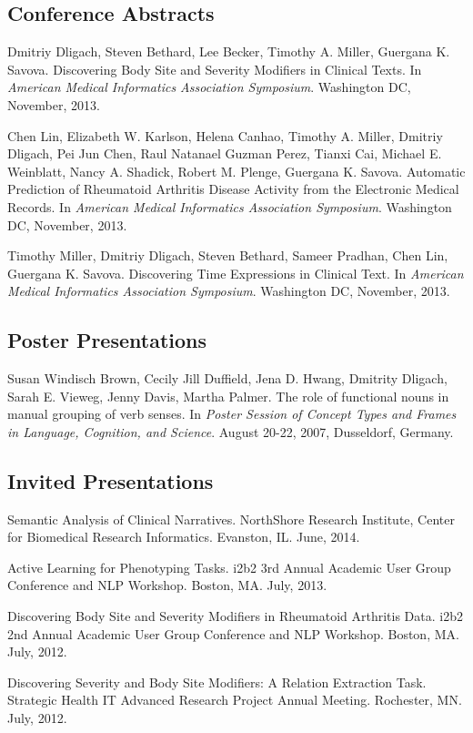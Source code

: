 \documentclass[letterpaper]{article}
\renewenvironment{itemize}{
  \begin{list}{}{
    \setlength{\leftmargin}{1.5em}
  }
}{
  \end{list}
}
\begin{document}
\subsection*{Conference Abstracts}
\begin{itemize}
\item Dmitriy Dligach, Steven Bethard, Lee Becker, Timothy A. Miller, Guergana K. Savova. Discovering Body Site and Severity Modifiers in Clinical Texts. In \emph{American Medical Informatics Association Symposium}. Washington DC, November, 2013.
\item Chen Lin, Elizabeth W. Karlson, Helena Canhao, Timothy A. Miller, Dmitriy Dligach, Pei Jun Chen, Raul Natanael Guzman Perez, Tianxi Cai, Michael E. Weinblatt, Nancy A. Shadick, Robert M. Plenge, Guergana K. Savova. Automatic Prediction of Rheumatoid Arthritis Disease Activity from the Electronic Medical Records. In \emph{American Medical Informatics Association Symposium}. Washington DC, November, 2013.
\item Timothy Miller, Dmitriy Dligach, Steven Bethard, Sameer Pradhan, Chen Lin, Guergana K. Savova. Discovering Time Expressions in Clinical Text. In \emph{American Medical Informatics Association Symposium}. Washington DC, November, 2013.
\end{itemize}

\subsection*{Poster Presentations}

\begin{itemize}
\item Susan Windisch Brown, Cecily Jill Duffield, Jena D. Hwang, Dmitrity Dligach, Sarah E. Vieweg, Jenny Davis, Martha Palmer. The role of functional nouns in manual grouping of verb senses. In \emph {Poster Session of Concept Types and Frames in Language, Cognition, and Science}. August 20-22, 2007, Dusseldorf, Germany.
\end{itemize}

\subsection*{Invited Presentations}

\begin{itemize}
\item Semantic Analysis of Clinical Narratives. NorthShore Research Institute, Center for Biomedical Research Informatics. Evanston, IL. June, 2014.
\item Active Learning for Phenotyping Tasks. i2b2 3rd Annual Academic User Group Conference and NLP Workshop. Boston, MA. July, 2013.
\item Discovering Body Site and Severity Modifiers in Rheumatoid Arthritis Data. i2b2 2nd Annual Academic User Group Conference and NLP Workshop. Boston, MA. July, 2012.
\item Discovering Severity and Body Site Modifiers: A Relation Extraction Task. Strategic Health IT Advanced Research Project Annual Meeting. Rochester, MN. July, 2012.
\end{itemize}
\end{document}
